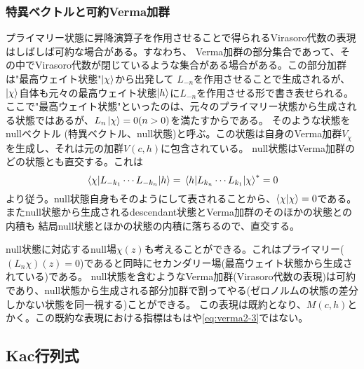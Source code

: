 \documentclass[11pt, aps, longbibliography]{article}
\numberwithin{equation}{section}
\begin{document}
        \subsubsection{特異ベクトルと可約Verma加群}
        プライマリー状態に昇降演算子を作用させることで得られるVirasoro代数の表現はしばしば可約な場合がある。すなわち、
        Verma加群の部分集合であって、その中でVirasoro代数が閉じているような集合がある場合がある。この部分加群は"最高ウェイト状態"$\ket{\chi}$から出発して
        $L_{-n}$を作用させることで生成されるが、$\ket{\chi}$自体も元々の最高ウェイト状態$\ket{h}$に$L_{-n}$を作用させる形で書き表せられる。
        ここで"最高ウェイト状態"といったのは、元々のプライマリー状態から生成される状態ではあるが、$L_n\ket{\chi}=0 (n>0)$を満たすからである。
        そのような状態をnullベクトル (特異ベクトル、null状態)と呼ぶ。この状態は自身のVerma加群$V_\chi$を生成し、それは元の加群$V(c,h)$に包含されている。
        null状態はVerma加群のどの状態とも直交する。これは
        \begin{equation}\label{eq:verma3-1}
            \matrixel{\chi}{L_{-k_1}\cdots L_{-k_n}}{h} = \matrixel{h}{L_{k_n}\cdots L_{k_1}}{\chi}^* = 0
        \end{equation}
        より従う。null状態自身もそのようにして表されることから、$\braket{\chi}{\chi}=0$である。またnull状態から生成されるdescendant状態とVerma加群のそのほかの状態との内積も
        結局null状態とほかの状態の内積に落ちるので、直交する。

        null状態に対応するnull場$\chi (z)$も考えることができる。これはプライマリー($(L_n\chi)(z)=0$)であると同時にセカンダリー場(最高ウェイト状態から生成されている)である。
        null状態を含むようなVerma加群(Virasoro代数の表現)は可約であり、null状態から生成される部分加群で割ってやる(ゼロノルムの状態の差分しかない状態を同一視する)ことができる。
        この表現は既約となり、$M(c,h)$とかく。この既約な表現における指標はもはや\eqref{eq:verma2-3}ではない。

    \subsection{Kac行列式}
\end{document}
